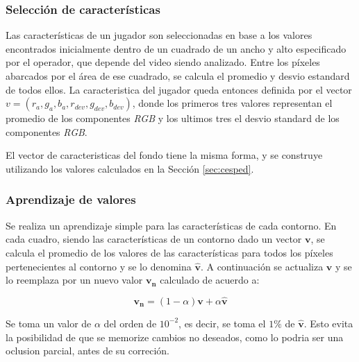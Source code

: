 \subsubsection{Selección de características}

Las características de un jugador son seleccionadas en base a los valores
encontrados inicialmente dentro de un cuadrado de un ancho y alto especificado
por el operador, que depende del video siendo analizado. Entre los píxeles
abarcados por el área de ese cuadrado, se calcula el promedio y desvio estandard
de todos ellos. La caracteristica del jugador queda entonces definida por el
vector $v = (r_a, g_a, b_a, r_{dev}, g_{dev}, b_{dev})$, donde los primeros
tres valores representan el promedio de los componentes \textit{RGB} y los ultimos
tres el desvio standard de los componentes \textit{RGB}.

El vector de caracteristicas del fondo tiene la misma forma, y se construye
utilizando los valores calculados en la Sección \ref{sec:cesped}.

\subsubsection{Aprendizaje de valores}

Se realiza un aprendizaje simple para las características de cada contorno. En
cada cuadro, siendo las características de un contorno dado un vector
$\mathbf{v}$, se calcula el promedio de los valores de las características para
todos los píxeles pertenecientes al contorno y se lo denomina
$\hat{\mathbf{v}}$. A continuación se actualiza $\mathbf{v}$ y se lo reemplaza
por un nuevo valor $\mathbf{v_n}$ calculado de acuerdo a:

\[
  \mathbf{v_n} = \left(1-\alpha\right)\mathbf{v} + \alpha \hat{\mathbf{v}}
\]

Se toma un valor de $\alpha$ del orden de $10^{-2}$, es decir, se toma el $1\%$
de $\hat{\mathbf{v}}$. Esto evita la posibilidad de que se memorize cambios
no deseados, como lo podria ser una oclusion parcial, antes de su correción.

